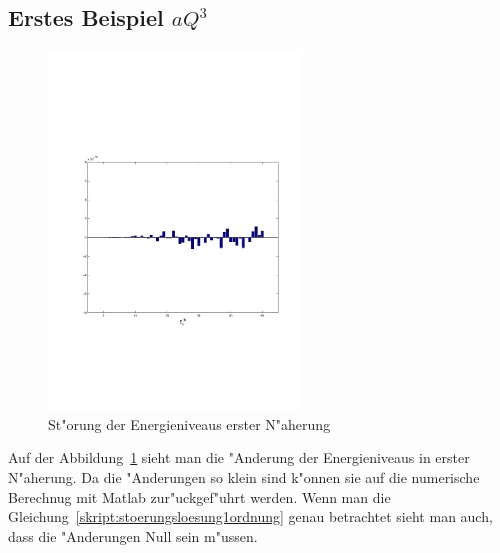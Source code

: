 \begin{refsection}
\subsection{Erstes Beispiel $aQ^3$}

\begin{figure}[h]	%
\centering
\includegraphics[width=0.6\textwidth]{anharmonisch/images/x3/EK1.pdf}
\caption{St"orung der Energieniveaus erster N"aherung
\label{skript:x3_EK1}}
\end{figure}

Auf der Abbildung~\ref{skript:x3_EK1} sieht man die "Anderung der Energieniveaus in erster N"aherung. Da die "Anderungen so klein sind k"onnen sie auf die numerische Berechnug mit Matlab zur"uckgef"uhrt werden. Wenn man die Gleichung~\ref{skript:stoerungsloesung1ordnung} genau betrachtet sieht man auch, dass die "Anderungen Null sein m"ussen.


\end{refsection}
